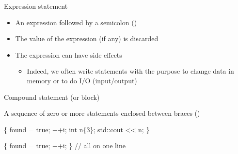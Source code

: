 \begin{frame}[fragile]{Expression statement}

  \begin{itemize}[<+->]
  \item An expression followed by a semicolon (\code{;})
  \item The value of the expression (if any) is discarded
  \item The expression can have side effects
    \begin{itemize}[<.->]
    \item Indeed, we often write statements with the purpose to change data in
      memory or to do I/O (input/output)
    \end{itemize}
  \end{itemize}

  \begin{codeblock}
\end{codeblock}

\end{frame}

\begin{frame}[fragile]{Compound statement (or block)}

  A sequence of zero or more statements enclosed between braces
  (\code{\{\}})

  \begin{codeblock}
\{
   found = true;
   ++i;
   int n\{3\};
   std::cout << n;
\}\end{codeblock}

  \begin{codeblock}
\{ found = true; ++i; \ddd \} // all on one line\end{codeblock}

\end{frame}

